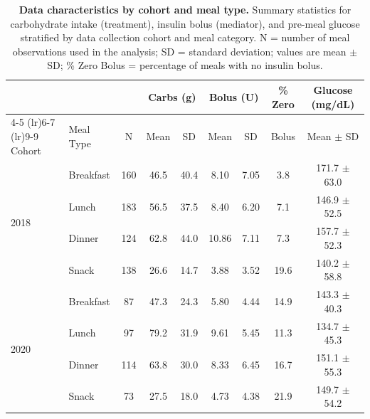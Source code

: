 \begin{table}[ht]
\centering
\small
\caption{\textbf{Data characteristics by cohort and meal type.}
Summary statistics for carbohydrate intake (treatment), insulin bolus (mediator),
and pre-meal glucose stratified by data collection cohort and meal category.
N = number of meal observations used in the analysis; SD = standard deviation; values are mean $\pm$ SD;
\% Zero Bolus = percentage of meals with no insulin bolus.}
\label{tab:cohort_meal_summary}
\begin{tabular}{llccccccc}
\toprule
& & & \multicolumn{2}{c}{Carbs (g)} & \multicolumn{2}{c}{Bolus (U)} & \% Zero & Glucose (mg/dL) \\
\cmidrule(lr){4-5} \cmidrule(lr){6-7} \cmidrule(lr){9-9}
Cohort & Meal Type & N & Mean & SD & Mean & SD & Bolus & Mean $\pm$ SD \\
\midrule
\multirow{4}{*}{2018} & Breakfast & 160 & 46.5 & 40.4 & 8.10 & 7.05 & 3.8 & 171.7 $\pm$ 63.0 \\
 & Lunch & 183 & 56.5 & 37.5 & 8.40 & 6.20 & 7.1 & 146.9 $\pm$ 52.5 \\
 & Dinner & 124 & 62.8 & 44.0 & 10.86 & 7.11 & 7.3 & 157.7 $\pm$ 52.3 \\
 & Snack & 138 & 26.6 & 14.7 & 3.88 & 3.52 & 19.6 & 140.2 $\pm$ 58.8 \\
\midrule
\multirow{4}{*}{2020} & Breakfast & 87 & 47.3 & 24.3 & 5.80 & 4.44 & 14.9 & 143.3 $\pm$ 40.3 \\
 & Lunch & 97 & 79.2 & 31.9 & 9.61 & 5.45 & 11.3 & 134.7 $\pm$ 45.3 \\
 & Dinner & 114 & 63.8 & 30.0 & 8.33 & 6.45 & 16.7 & 151.1 $\pm$ 55.3 \\
 & Snack & 73 & 27.5 & 18.0 & 4.73 & 4.38 & 21.9 & 149.7 $\pm$ 54.2 \\
\bottomrule
\end{tabular}
\end{table}
